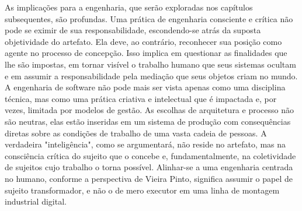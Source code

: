 As implicações para a engenharia, que serão exploradas nos capítulos subsequentes, são profundas. 
Uma prática de engenharia consciente e crítica não pode se eximir de sua 
responsabilidade, escondendo-se atrás da suposta objetividade do artefato. 
Ela deve, ao contrário, reconhecer sua posição como agente no processo de concepção. 
Isso implica em 
questionar as finalidades que lhe são impostas, em tornar visível o trabalho humano que seus sistemas ocultam e em assumir a responsabilidade pela mediação que seus objetos 
criam no mundo. 
A engenharia de software não pode mais ser vista apenas como uma disciplina técnica, mas como uma prática criativa e intelectual que é impactada e, por vezes, 
limitada por modelos de gestão. 
As escolhas de arquitetura e processo não são neutras, elas estão inseridas em um sistema de produção com consequências diretas sobre as 
condições de trabalho de uma vasta cadeia de pessoas. 
A verdadeira "inteligência", como se argumentará, não reside no artefato, mas na consciência crítica do sujeito que o 
concebe e, fundamentalmente, na coletividade de sujeitos cujo trabalho o torna possível. 
Alinhar-se a uma engenharia centrada no humano, conforme a perspectiva de Vieira Pinto, 
significa assumir o papel de sujeito transformador, e não o de mero executor em uma linha de montagem industrial digital. 